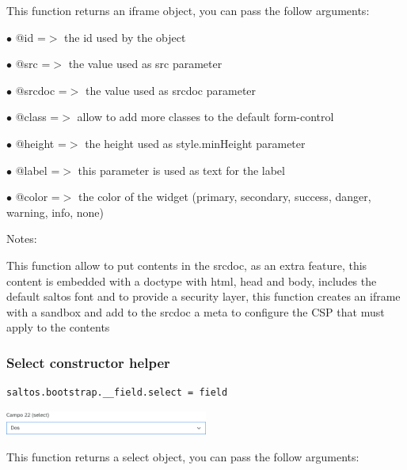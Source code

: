 \documentclass[a4paper]{article}
\begin{document}
This function returns an iframe object, you can pass the follow arguments:

\begin{compactitem}
\item[\color{myblue}$\bullet$] @id     =$>$ the id used by the object
\item[\color{myblue}$\bullet$] @src    =$>$ the value used as src parameter
\item[\color{myblue}$\bullet$] @srcdoc =$>$ the value used as srcdoc parameter
\item[\color{myblue}$\bullet$] @class  =$>$ allow to add more classes to the default form-control
\item[\color{myblue}$\bullet$] @height =$>$ the height used as style.minHeight parameter
\item[\color{myblue}$\bullet$] @label  =$>$ this parameter is used as text for the label
\item[\color{myblue}$\bullet$] @color  =$>$ the color of the widget (primary, secondary, success, danger, warning, info, none)
\end{compactitem}

Notes:

This function allow to put contents in the srcdoc, as an extra feature, this content is
embedded with a doctype with html, head and body, includes the default saltos font and
to provide a security layer, this function creates an iframe with a sandbox and add to
the srcdoc a meta to configure the CSP that must apply to the contents

\hypertarget{toc63}{}
\subsubsection{Select constructor helper}

\begin{lstlisting}
saltos.bootstrap.__field.select = field
\end{lstlisting}

\begin{center}\includegraphics[width=0.5\textwidth]{../ujest/snaps/test-bootstrap-js-bootstrap-campo-22-select-1-snap.png}\end{center}

This function returns a select object, you can pass the follow arguments:
\end{document}
